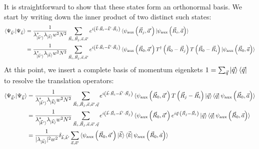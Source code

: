 \documentclass{report}
\numberwithin{equation}{section}
\begin{document}
It is straightforward to show that these states form an orthonormal basis. We start by writing down the inner product of two distinct such states:
\begin{equation}\begin{aligned}
	\braket{\Psi_{\vec k^\prime} | \Psi_{\vec k}} 
	&= \frac{1}{\lambda_{\ket{\vec k^\prime}}^* \lambda_{\ket{\vec k}} w^2 N^2}\sum_{\vec R_i, \vec R_j, \vec a, \vec a^\prime} e^{i \left(\vec{k}\cdot\vec{R}_i - \vec{k}^\prime\cdot\vec{R}_j\right) } \braket{\psi_\text{aux}\left( \vec R_j, \vec a^\prime \right) | \psi_\text{aux}\left( \vec R_i, \vec a \right)} \\
	&= \frac{1}{\lambda_{\ket{\vec k^\prime}}^* \lambda_{\ket{\vec k}} w^2 N^2}\sum_{\vec R_i, \vec R_j, \vec a, \vec a^\prime} e^{i \left(\vec{k}\cdot\vec{R}_i - \vec{k}^\prime\cdot\vec{R}_j\right) } \braket{\psi_\text{aux}\left( \vec R_0, \vec a^\prime \right) T^\dagger\left( \vec R_0 - \vec R_j \right) T\left( \vec R_0 - \vec R_i \right) | \psi_\text{aux}\left( \vec R_0, \vec a \right)}\\
\end{aligned}\end{equation}
At this point, we insert a complete basis of momentum eigenkets \(1 = \sum_{\vec q}\ket{\vec q}\bra{\vec q}\) to resolve the translation operators:
\begin{equation}\begin{aligned}
	\braket{\Psi_{\vec k^\prime} | \Psi_{\vec k}} &= \frac{1}{\lambda_{\ket{\vec k^\prime}}^* \lambda_{\ket{\vec k}} w^2 N^2}\sum_{\vec R_i, \vec R_j, \vec a, \vec a^\prime, \vec q} e^{i \left(\vec{k}\cdot\vec{R}_i - \vec{k}^\prime\cdot\vec{R}_j\right) } \braket{\psi_\text{aux}\left( \vec R_0, \vec a^\prime \right) T\left( \vec R_j - \vec R_i \right) \ket{\vec q}\bra{\vec q} \psi_\text{aux}\left( \vec R_0, \vec a \right)}\\
						      &= \frac{1}{\lambda_{\ket{\vec k^\prime}}^* \lambda_{\ket{\vec k}} w^2 N^2}\sum_{\vec R_i, \vec R_j, \vec a, \vec a^\prime, \vec q} e^{i \left(\vec{k}\cdot\vec{R}_i - \vec{k}^\prime\cdot\vec{R}_j\right) } \braket{\psi_\text{aux}\left( \vec R_0, \vec a^\prime \right) e^{i \vec q \cdot \left( \vec R_j - \vec R_i \right)} \ket{\vec q}\bra{\vec q} \psi_\text{aux}\left( \vec R_0, \vec a \right)} \\
						      &= \frac{1}{|\lambda_{\ket{\vec k}}|^2 w^2} \delta_{\vec k, \vec k^\prime}\sum_{\vec a, \vec a^\prime}\braket{\psi_\text{aux}\left( \vec R_0, \vec a^\prime \right) \ket{\vec k}\bra{\vec k} \psi_\text{aux}\left( \vec R_0, \vec a \right)}\\
\end{aligned}\end{equation}
\end{document}
